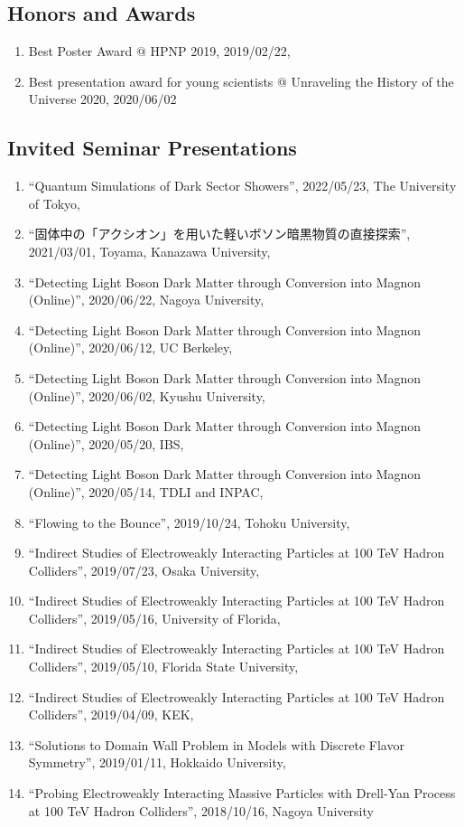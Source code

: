 \documentclass[12pt]{article}
\begin{document}
\subsection*{Honors and Awards}
\begin{enumerate}
 \item Best Poster Award @ HPNP 2019, 2019/02/22,\item Best presentation award for young scientists @ Unraveling the History of the Universe 2020, 2020/06/02
\end{enumerate}



\nocite{*}

\subsection*{Invited Seminar Presentations}
\begin{enumerate}
 \item ``Quantum Simulations of Dark Sector Showers'', 2022/05/23, The University of Tokyo,\item ``固体中の「アクシオン」を用いた軽いボソン暗黒物質の直接探索'', 2021/03/01, Toyama, Kanazawa University,\item ``Detecting Light Boson Dark Matter through Conversion into Magnon (Online)'', 2020/06/22, Nagoya University,\item ``Detecting Light Boson Dark Matter through Conversion into Magnon (Online)'', 2020/06/12, UC Berkeley,\item ``Detecting Light Boson Dark Matter through Conversion into Magnon (Online)'', 2020/06/02, Kyushu University,\item ``Detecting Light Boson Dark Matter through Conversion into Magnon (Online)'', 2020/05/20, IBS,\item ``Detecting Light Boson Dark Matter through Conversion into Magnon (Online)'', 2020/05/14, TDLI and INPAC,\item ``Flowing to the Bounce'', 2019/10/24, Tohoku University,\item ``Indirect Studies of Electroweakly Interacting Particles at 100 TeV Hadron Colliders'', 2019/07/23, Osaka University,\item ``Indirect Studies of Electroweakly Interacting Particles at 100 TeV Hadron Colliders'', 2019/05/16, University of Florida,\item ``Indirect Studies of Electroweakly Interacting Particles at 100 TeV Hadron Colliders'', 2019/05/10, Florida State University,\item ``Indirect Studies of Electroweakly Interacting Particles at 100 TeV Hadron Colliders'', 2019/04/09, KEK,\item ``Solutions to Domain Wall Problem in Models with Discrete Flavor Symmetry'', 2019/01/11, Hokkaido University,\item ``Probing Electroweakly Interacting Massive Particles with Drell-Yan Process at 100 TeV Hadron Colliders'', 2018/10/16, Nagoya University
\end{enumerate}
\end{document}
